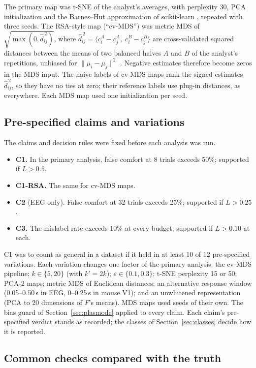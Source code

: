 \documentclass[11pt]{article}
\begin{document}
The primary map was t-SNE \citep{vandermaaten2008} of the analyst's averages, with perplexity 30, PCA initialization \citep{kobak2021} and the Barnes--Hut approximation of scikit-learn \citep{pedregosa2011}, repeated with three seeds.
The RSA-style map (``cv-MDS'') was metric MDS of $\sqrt{\max(0,\hat d^{\,2}_{ij})}$, where $\hat d^{\,2}_{ij}=\langle c^A_i-c^A_j,\;c^B_i-c^B_j\rangle$ are cross-validated squared distances between the means of two balanced halves $A$ and $B$ of the analyst's repetitions, unbiased for $\|\mu_i-\mu_j\|^2$ \citep{walther2016}.
Negative estimates therefore become zeros in the MDS input.
The naive labels of cv-MDS maps rank the signed estimates $\hat d^{\,2}_{ij}$, so they have no ties at zero; their reference labels use plug-in distances, as everywhere.
Each MDS map used one initialization per seed.

\subsection{Pre-specified claims and variations}\label{sec:claims}

The claims and decision rules were fixed before each analysis was run.
\begin{itemize}[leftmargin=*]
  \item \textbf{C1.} In the primary analysis, false comfort at 8 trials exceeds 50\%; supported if $L>0.5$.
  \item \textbf{C1-RSA.} The same for cv-MDS maps.
  \item \textbf{C2} (EEG only). False comfort at 32 trials exceeds 25\%; supported if $L>0.25$.
  \item \textbf{C3.} The mislabel rate exceeds 10\% at every budget; supported if $L>0.10$ at each.
\end{itemize}
C1 was to count as general in a dataset if it held in at least 10 of 12 pre-specified variations.
Each variation changes one factor of the primary analysis: the cv-MDS pipeline; $k\in\{5,20\}$ (with $k'=2k$); $\varepsilon\in\{0.1,0.3\}$; t-SNE perplexity 15 or 50; PCA-2 maps; metric MDS of Euclidean distances; an alternative response window (0.05--0.50\,s in EEG, 0--0.25\,s in mouse V1); and an unwhitened representation (PCA to 20 dimensions of $F$'s means).
MDS maps used seeds of their own.
The bias guard of Section~\ref{sec:plasmode} applied to every claim.
Each claim's pre-specified verdict stands as recorded; the classes of Section~\ref{sec:classes} decide how it is reported.

\subsection{Common checks compared with the truth}\label{sec:checks}
\end{document}
